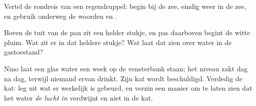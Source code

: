 \begin{exercise}[$\star$]\label{exo:g2:ice-water-steam:8}
Vertel de rondreis van een regendruppel: begin bij de zee, eindig weer
in de zee, en gebruik onderweg de woorden  en
.
\end{exercise}

\begin{exercise}[$\star\star$]\label{exo:g2:ice-water-steam:9}
Boven de tuit van de pan zit een helder stukje, en pas daarboven
begint de witte pluim. Wat zit er in dat heldere stukje? Wat laat dat
zien over water in de gastoestand?
\end{exercise}

\begin{exercise}[$\star\star$]\label{exo:g2:ice-water-steam:10}
Nino laat een glas water een week op de vensterbank staan; het niveau
zakt dag na dag, terwijl niemand ervan drinkt. Zijn kat wordt
beschuldigd. Verdedig de kat: leg uit wat er werkelijk is gebeurd, en
verzin een manier om te laten zien dat het water \emph{de lucht in}
verdwijnt en niet in de kat.
\end{exercise}
